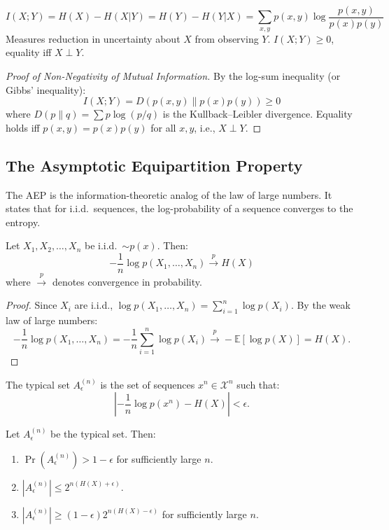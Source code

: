 \begin{definition}
\[
I(X;Y) = H(X) - H(X|Y) = H(Y) - H(Y|X) = \sum_{x,y} p(x,y) \log \frac{p(x,y)}{p(x)p(y)}
\]
Measures reduction in uncertainty about $X$ from observing $Y$. $I(X;Y) \ge 0$, equality iff $X \perp Y$.
\end{definition}

\begin{proof}[Proof of Non-Negativity of Mutual Information]
By the log-sum inequality (or Gibbs' inequality):
\[
I(X;Y) = D(p(x,y) \| p(x)p(y)) \ge 0
\]
where $D(p\|q) = \sum p\log(p/q)$ is the Kullback--Leibler divergence. Equality holds iff $p(x,y) = p(x)p(y)$ for all $x,y$, i.e., $X \perp Y$.
\end{proof}

\subsection{The Asymptotic Equipartition Property}
\label{sec:information:aep}

The AEP is the information-theoretic analog of the law of large numbers. It states that for i.i.d.\ sequences, the log-probability of a sequence converges to the entropy.

\begin{theorem}
Let $X_1,X_2,\dots,X_n$ be i.i.d.\ $\sim p(x)$. Then:
\[
-\frac{1}{n}\log p(X_1,\dots,X_n) \xrightarrow{p} H(X)
\]
where $\xrightarrow{p}$ denotes convergence in probability.
\end{theorem}

\begin{proof}
Since $X_i$ are i.i.d., $\log p(X_1,\dots,X_n) = \sum_{i=1}^n \log p(X_i)$. By the weak law of large numbers:
\[
-\frac{1}{n}\log p(X_1,\dots,X_n) = -\frac{1}{n}\sum_{i=1}^n \log p(X_i) \xrightarrow{p} -\mathbb{E}[\log p(X)] = H(X).
\]
\end{proof}

\begin{definition}
The typical set $A_\epsilon^{(n)}$ is the set of sequences $x^n \in \mathcal{X}^n$ such that:
\[
\left| -\frac{1}{n}\log p(x^n) - H(X) \right| < \epsilon.
\]
\end{definition}

\begin{theorem}
Let $A_\epsilon^{(n)}$ be the typical set. Then:
\begin{enumerate}
\item $\Pr(A_\epsilon^{(n)}) > 1 - \epsilon$ for sufficiently large $n$.
\item $|A_\epsilon^{(n)}| \le 2^{n(H(X)+\epsilon)}$.
\item $|A_\epsilon^{(n)}| \ge (1-\epsilon) 2^{n(H(X)-\epsilon)}$ for sufficiently large $n$.
\end{enumerate}
\end{theorem}


